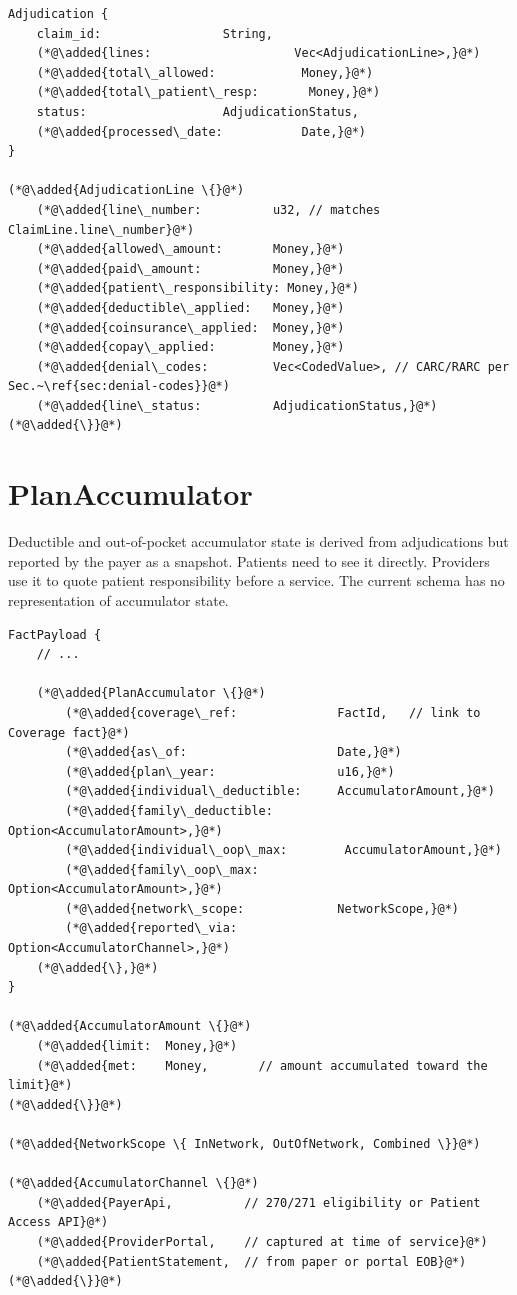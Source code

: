 \documentclass[11pt]{article}
\newcommand{\added}[1]{\textcolor{accentblue}{#1}}
\begin{document}
\begin{lstlisting}
Adjudication {
    claim_id:                 String,
    (*@\added{lines:                    Vec<AdjudicationLine>,}@*)
    (*@\added{total\_allowed:            Money,}@*)
    (*@\added{total\_patient\_resp:       Money,}@*)
    status:                   AdjudicationStatus,
    (*@\added{processed\_date:           Date,}@*)
}

(*@\added{AdjudicationLine \{}@*)
    (*@\added{line\_number:          u32, // matches ClaimLine.line\_number}@*)
    (*@\added{allowed\_amount:       Money,}@*)
    (*@\added{paid\_amount:          Money,}@*)
    (*@\added{patient\_responsibility: Money,}@*)
    (*@\added{deductible\_applied:   Money,}@*)
    (*@\added{coinsurance\_applied:  Money,}@*)
    (*@\added{copay\_applied:        Money,}@*)
    (*@\added{denial\_codes:         Vec<CodedValue>, // CARC/RARC per Sec.~\ref{sec:denial-codes}}@*)
    (*@\added{line\_status:          AdjudicationStatus,}@*)
(*@\added{\}}@*)
\end{lstlisting}

\section{PlanAccumulator}
\label{sec:accumulator}

Deductible and out-of-pocket accumulator state is derived from
adjudications but reported by the payer as a snapshot. Patients need to
see it directly. Providers use it to quote patient responsibility before
a service. The current schema has no representation of accumulator state.

\begin{lstlisting}
FactPayload {
    // ...

    (*@\added{PlanAccumulator \{}@*)
        (*@\added{coverage\_ref:              FactId,   // link to Coverage fact}@*)
        (*@\added{as\_of:                     Date,}@*)
        (*@\added{plan\_year:                 u16,}@*)
        (*@\added{individual\_deductible:     AccumulatorAmount,}@*)
        (*@\added{family\_deductible:         Option<AccumulatorAmount>,}@*)
        (*@\added{individual\_oop\_max:        AccumulatorAmount,}@*)
        (*@\added{family\_oop\_max:            Option<AccumulatorAmount>,}@*)
        (*@\added{network\_scope:             NetworkScope,}@*)
        (*@\added{reported\_via:              Option<AccumulatorChannel>,}@*)
    (*@\added{\},}@*)
}

(*@\added{AccumulatorAmount \{}@*)
    (*@\added{limit:  Money,}@*)
    (*@\added{met:    Money,       // amount accumulated toward the limit}@*)
(*@\added{\}}@*)

(*@\added{NetworkScope \{ InNetwork, OutOfNetwork, Combined \}}@*)

(*@\added{AccumulatorChannel \{}@*)
    (*@\added{PayerApi,          // 270/271 eligibility or Patient Access API}@*)
    (*@\added{ProviderPortal,    // captured at time of service}@*)
    (*@\added{PatientStatement,  // from paper or portal EOB}@*)
(*@\added{\}}@*)
\end{lstlisting}
\end{document}
